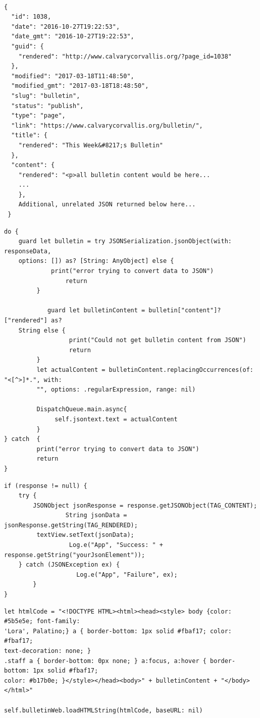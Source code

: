 \documentclass[letterpaper,10pt,draftclsnofoot,onecolumn,titlepage]{IEEEtran}
\begin{document}
\begin{lstlisting}[caption=iOS JSON Response]

{
  "id": 1038,
  "date": "2016-10-27T19:22:53",
  "date_gmt": "2016-10-27T19:22:53",
  "guid": {
    "rendered": "http://www.calvarycorvallis.org/?page_id=1038"
  },
  "modified": "2017-03-18T11:48:50",
  "modified_gmt": "2017-03-18T18:48:50",
  "slug": "bulletin",
  "status": "publish",
  "type": "page",
  "link": "https://www.calvarycorvallis.org/bulletin/",
  "title": {
    "rendered": "This Week&#8217;s Bulletin"
  },
  "content": {
    "rendered": "<p>all bulletin content would be here...
    ...
    },
    Additional, unrelated JSON returned below here...
 }

\end{lstlisting}

\begin{lstlisting}[caption=iOS JSON Parser]
 do {
 	guard let bulletin = try JSONSerialization.jsonObject(with: responseData,
	options: []) as? [String: AnyObject] else {
	         print("error trying to convert data to JSON")
                 return
         }

        	guard let bulletinContent = bulletin["content"]?["rendered"] as?
	String else {
                  print("Could not get bulletin content from JSON")
                  return
         }
         let actualContent = bulletinContent.replacingOccurrences(of: "<[^>]*.", with:
         "", options: .regularExpression, range: nil)

         DispatchQueue.main.async{
 	          self.jsontext.text = actualContent
         }
} catch  {
         print("error trying to convert data to JSON")
         return
}
\end{lstlisting}

\begin{lstlisting}[caption=Android JSON Parser]
if (response != null) {
	try {
		JSONObject jsonResponse = response.getJSONObject(TAG_CONTENT);
                 String jsonData = jsonResponse.getString(TAG_RENDERED);
		 textView.setText(jsonData);
                  Log.e("App", "Success: " + response.getString("yourJsonElement"));
	} catch (JSONException ex) {
                    Log.e("App", "Failure", ex);
        }
}
\end{lstlisting}

\begin{lstlisting}[caption=iOS Load into WebView]
let htmlCode = "<!DOCTYPE HTML><html><head><style> body {color: #5b5e5e; font-family:
'Lora', Palatino;} a { border-bottom: 1px solid #fbaf17; color: #fbaf17;
text-decoration: none; }
.staff a { border-bottom: 0px none; } a:focus, a:hover { border-bottom: 1px solid #fbaf17;
color: #b17b0e; }</style></head><body>" + bulletinContent + "</body></html>"

self.bulletinWeb.loadHTMLString(htmlCode, baseURL: nil)
		\end{lstlisting}
\end{document}
